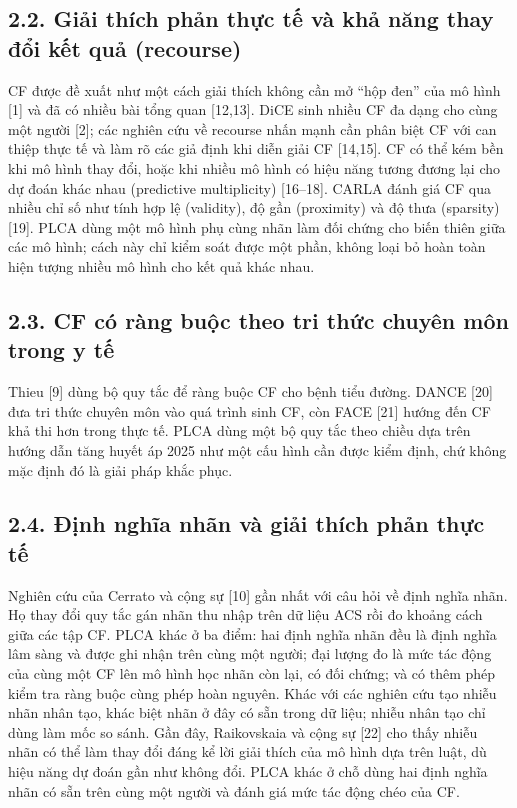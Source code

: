 \documentclass[9pt,a4paper]{extarticle}
\begin{document}
\subsection{2.2. Giải thích phản thực tế và khả năng thay đổi kết quả
(recourse)}

CF được đề xuất như một cách giải thích không cần mở ``hộp đen'' của mô
hình {[}1{]} và đã có nhiều bài tổng quan {[}12,13{]}. DiCE sinh nhiều
CF đa dạng cho cùng một người {[}2{]}; các nghiên cứu về recourse nhấn
mạnh cần phân biệt CF với can thiệp thực tế và làm rõ các giả định khi
diễn giải CF {[}14,15{]}. CF có thể kém bền khi mô hình thay đổi, hoặc
khi nhiều mô hình có hiệu năng tương đương lại cho dự đoán khác nhau
(predictive multiplicity) {[}16--18{]}. CARLA đánh giá CF qua nhiều chỉ
số như tính hợp lệ (validity), độ gần (proximity) và độ thưa (sparsity)
{[}19{]}. PLCA dùng một mô hình phụ cùng nhãn làm đối chứng cho biến
thiên giữa các mô hình; cách này chỉ kiểm soát được một phần, không loại
bỏ hoàn toàn hiện tượng nhiều mô hình cho kết quả khác nhau.

\subsection{2.3. CF có ràng buộc theo tri thức chuyên môn trong y tế}

Thieu {[}9{]} dùng bộ quy tắc để ràng buộc CF cho bệnh tiểu đường. DANCE
{[}20{]} đưa tri thức chuyên môn vào quá trình sinh CF, còn FACE
{[}21{]} hướng đến CF khả thi hơn trong thực tế. PLCA dùng một bộ quy
tắc theo chiều dựa trên hướng dẫn tăng huyết áp 2025 như một cấu hình
cần được kiểm định, chứ không mặc định đó là giải pháp khắc phục.

\subsection{2.4. Định nghĩa nhãn và giải thích phản thực tế}

Nghiên cứu của Cerrato và cộng sự {[}10{]} gần nhất với câu hỏi về định
nghĩa nhãn. Họ thay đổi quy tắc gán nhãn thu nhập trên dữ liệu ACS rồi
đo khoảng cách giữa các tập CF. PLCA khác ở ba điểm: hai định nghĩa nhãn
đều là định nghĩa lâm sàng và được ghi nhận trên cùng một người; đại
lượng đo là mức tác động của cùng một CF lên mô hình học nhãn còn lại,
có đối chứng; và có thêm phép kiểm tra ràng buộc cùng phép hoàn nguyên.
Khác với các nghiên cứu tạo nhiễu nhãn nhân tạo, khác biệt nhãn ở đây có
sẵn trong dữ liệu; nhiễu nhân tạo chỉ dùng làm mốc so sánh. Gần đây,
Raikovskaia và cộng sự {[}22{]} cho thấy nhiễu nhãn có thể làm thay đổi
đáng kể lời giải thích của mô hình dựa trên luật, dù hiệu năng dự đoán
gần như không đổi. PLCA khác ở chỗ dùng hai định nghĩa nhãn có sẵn trên
cùng một người và đánh giá mức tác động chéo của CF.
\end{document}

